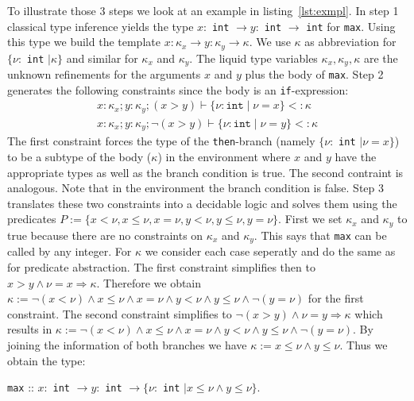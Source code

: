\documentclass[a4paper,UKenglish]{lipics-v2016}
\begin{document}
To illustrate those 3 steps we look at an example in listing~\ref{lst:exmpl}.
In step 1 classical type inference yields the type $x:$ \lstinline{int} $\rightarrow y:$ \lstinline{int} $\rightarrow$ \lstinline{int} for \lstinline{max}.
Using this type we build the template $x: \kappa_x \rightarrow y: \kappa_y \rightarrow \kappa$.
We use $\kappa$ as abbreviation for $\{ \nu:$ \lstinline{int} $\mid \kappa\}$ and similar for $\kappa_x$ and $\kappa_y$.
The liquid type variables $\kappa_x, \kappa_y, \kappa$ are the unknown refinements for the arguments $x$ and $y$ plus the body of \lstinline{max}.
Step 2 generates the following constraints since the body is an \lstinline{if}-expression:
\begin{align}
    \label{algn:max}
    x: \kappa_x; y: \kappa_y; (x > y) \vdash \{\nu: \texttt{int} \mid \nu = x \} <: \kappa\\
    x: \kappa_x; y: \kappa_y; \neg(x > y) \vdash \{\nu: \texttt{int} \mid \nu = y \} <: \kappa
\end{align}
The first constraint forces the type of the \lstinline{then}-branch (namely $\{\nu:$ \lstinline{int} $\mid \nu = x \}$) to be a subtype
of the body ($\kappa$) in the environment where $x$ and $y$ have the appropriate types as well as the branch condition is true.
The second contraint is analogous.
Note that in the environment the branch condition is false.
Step 3 translates these two constraints into a decidable logic and solves them using the predicates $P := \{x < \nu, x \le \nu, x = \nu, y < \nu, y \le \nu, y = \nu\}$.
First we set $\kappa_x$ and $\kappa_y$ to true because there are no constraints on $\kappa_x$ and $\kappa_y$.
This says that \lstinline{max} can be called by any integer.
For $\kappa$ we consider each case seperatly and do the same as for predicate abstraction.
The first constraint simplifies then to $x > y \land \nu = x \Rightarrow \kappa$.
Therefore we obtain $\kappa := \neg(x < \nu) \land x \le \nu \land x = \nu \land y < \nu \land y \le \nu \land \neg(y = \nu)$ for the first constraint.
The second constraint simplifies to $\neg(x > y) \land \nu = y \Rightarrow \kappa$
which results in $\kappa := \neg(x < \nu) \land x \le \nu \land x = \nu \land y < \nu \land y \le \nu \land \neg(y = \nu)$.
By joining the information of both branches we have $\kappa := x \le \nu \land y \le \nu$.
Thus we obtain the type:
\begin{center}
    \lstinline{max} :: $x:$ \lstinline{int} $\rightarrow y:$ \lstinline{int} $\rightarrow \{\nu:$ \lstinline{int} $\mid x \le \nu \land y \le \nu\}$.
\end{center}
\end{document}
